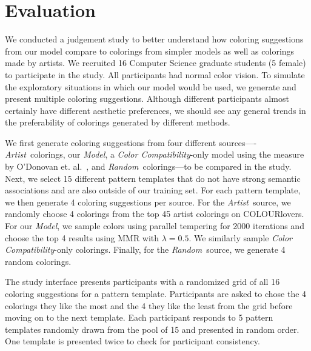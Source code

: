 \section{Evaluation}
\label{sec:evaluation}

We conducted a judgement study to better understand how coloring suggestions from our model compare to colorings from simpler models as well as colorings made by artists. We recruited 16 Computer Science graduate students (5 female) to participate in the study. All participants had normal color vision. To simulate the exploratory situations in which our model would be used, we generate and present multiple coloring suggestions. Although different participants almost certainly have different aesthetic preferences, we should see any general trends in the preferability of colorings generated by different methods. 

\newcommand{\artistSource}{\emph{Artist}}
\newcommand{\modelSource}{\emph{Model}}
\newcommand{\compatSource}{\emph{Color Compatibility}}
\newcommand{\randomSource}{\emph{Random}}
We first generate coloring suggestions from four different sources----\artistSource~colorings, our \modelSource, a \compatSource-only model using the measure by O'Donovan et. al.~, and \randomSource~colorings---to be compared in the study. Next, we select 15 different pattern templates that do not have strong semantic associations and are also outside of our training set. For each pattern template, we then generate 4 coloring suggestions per source. For the \artistSource~source, we randomly choose 4 colorings from the top 45 artist colorings on COLOURlovers. For our \modelSource, we sample colors using parallel tempering for 2000 iterations and choose the top 4 results using MMR with $\lambda = 0.5$. We similarly sample \compatSource-only colorings. Finally, for the \randomSource~source, we generate 4 random colorings.

The study interface presents participants with a randomized grid of all 16 coloring suggestions for a pattern template. Participants are asked to chose the 4 colorings they like the most and the 4 they like the least from the grid before moving on to the next template. Each participant responds to 5 pattern templates randomly drawn from the pool of 15 and presented in random order. One template is presented twice to check for participant consistency.

